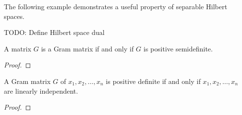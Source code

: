 

\begin{definition}
    \label{def:definite-matrix}
    \cite{horn2013matrix}
    
\end{definition}

\begin{definition}
    \label{def:inner-product}
    \cite{small1994hilbert} %
    
\end{definition}

\begin{example}
    \label{eg:dot-product}
    
\end{example}

\begin{definition}
    \label{def:hilbert-space}
    \cite{kreyszig1991introductory}
    
\end{definition}

The following example demonstrates a useful property of separable Hilbert spaces.

\begin{example}
    \label{eg-l2-hilbert-space}
    \cite{rudin1987real}
    
\end{example}

TODO: Define Hilbert space dual

\begin{definition}
    \label{def:gram-matrix}
    \cite{horn2013matrix}
    
\end{definition}

\begin{example}
    \label{eg:gram-matrix}
    
\end{example}

\begin{theorem}
    \label{thm:gram-psd}
    \cite{horn2013matrix}
    A matrix \(G\) is a Gram matrix if and only if \(G\) is positive semidefinite.
\end{theorem}
\begin{proof}
    
\end{proof}

\begin{theorem}
    \label{thm:gram-pd-iff-lin-indep}
    \cite{horn2013matrix}
    A Gram matrix \(G\) of \(x_1, x_2, \dots, x_n\) is positive definite if and only if \(x_1, x_2, \dots, x_n\) are linearly independent.
\end{theorem}
\begin{proof}
    
\end{proof}

